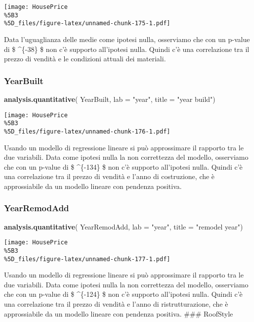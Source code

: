 \documentclass[
]{article}
\newenvironment{Shaded}{\begin{snugshade}}{\end{snugshade}}
\newcommand{\AttributeTok}[1]{\textcolor[rgb]{0.13,0.29,0.53}{#1}}
\newcommand{\FunctionTok}[1]{\textcolor[rgb]{0.13,0.29,0.53}{\textbf{#1}}}
\newcommand{\NormalTok}[1]{#1}
\newcommand{\StringTok}[1]{\textcolor[rgb]{0.31,0.60,0.02}{#1}}
\begin{document}
\texttt{[image: HousePrice\\\%5B3\\\%5D\_files/figure-latex/unnamed-chunk-175-1.pdf]}

Data l'uguaglianza delle medie come ipotesi nulla, osserviamo che con un
p-value di \$ \^{}\{-38\} \$ non c'è supporto all'ipotesi
nulla. Quindi c'è una correlazione tra il prezzo di vendità e le
condizioni attuali dei materiali.

\subsubsection{YearBuilt}\label{yearbuilt-1}

\begin{Shaded}
\begin{Highlighting}[]
\FunctionTok{analysis.quantitative}\NormalTok{(}
\NormalTok{    YearBuilt,}
    \AttributeTok{lab =} \StringTok{"year"}\NormalTok{,}
    \AttributeTok{title =} \StringTok{"year build"}\NormalTok{)}
\end{Highlighting}
\end{Shaded}

\texttt{[image: HousePrice\\\%5B3\\\%5D\_files/figure-latex/unnamed-chunk-176-1.pdf]}

Usando un modello di regressione lineare si può approssimare il rapporto
tra le due variabili. Data come ipotesi nulla la non correttezza del
modello, osserviamo che con un p-value di \$ \^{}\{-134\} \$
non c'è supporto all'ipotesi nulla. Quindi c'è una correlazione tra il
prezzo di vendità e l'anno di costruzione, che è approssiabile da un
modello lineare con pendenza positiva.

\subsubsection{YearRemodAdd}\label{yearremodadd}

\begin{Shaded}
\begin{Highlighting}[]
\FunctionTok{analysis.quantitative}\NormalTok{(}
\NormalTok{    YearRemodAdd,}
    \AttributeTok{lab =} \StringTok{"year"}\NormalTok{,}
    \AttributeTok{title =} \StringTok{"remodel year"}\NormalTok{)}
\end{Highlighting}
\end{Shaded}

\texttt{[image: HousePrice\\\%5B3\\\%5D\_files/figure-latex/unnamed-chunk-177-1.pdf]}

Usando un modello di regressione lineare si può approssimare il rapporto
tra le due variabili. Data come ipotesi nulla la non correttezza del
modello, osserviamo che con un p-value di \$ \^{}\{-124\} \$
non c'è supporto all'ipotesi nulla. Quindi c'è una correlazione tra il
prezzo di vendità e l'anno di ristrutturazione, che è approssiabile da
un modello lineare con pendenza positiva. \#\#\# RoofStyle
\end{document}

